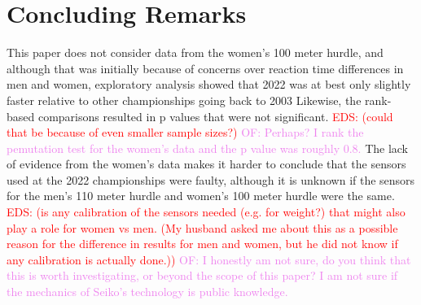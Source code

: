 \documentclass[12pt, letterpaper, titlepage]{article}
\newcommand{\eds}[1]{\textcolor{red}{EDS: (#1)}}
\newcommand{\of}[1]{\textcolor{violet}{OF: #1}}
\begin{document}
\section{Concluding Remarks}\label{sec:concludingremarks}



This paper does not consider data from the women's 100 meter hurdle, and although
that was initially because of concerns over reaction time differences in men and
women, exploratory analysis showed that 2022 was at best only
slightly faster relative to other championships going back to 2003 
Likewise, the rank-based comparisons resulted in p values
that were not significant. 
\eds{could that be because of even smaller sample sizes?}
\of{Perhaps? I rank the pemutation test for the women's data and the
p value was roughly 0.8.}
  The lack of evidence from the women's data makes it 
harder to conclude that the sensors used at the 2022 championships were faulty, 
although it is unknown if the sensors for the men's 110 meter hurdle and women's
100 meter hurdle were the same.  
\eds{is any calibration of the sensors needed (e.g. for weight?) that might
also play a role for women vs men. (My husband asked me about this as a possible 
reason for the difference in results for men and women, but he did not know
if any calibration is actually done.)}
\of{I honestly am not sure, do you think that this is worth investigating, or
beyond the scope of this paper? I am not sure if the mechanics of Seiko's
technology is public knowledge.}
\end{document}
